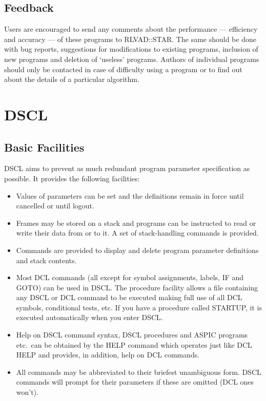 \subsection {Feedback}
Users are encouraged to send any comments about the performance --- efficiency
and accuracy --- of these programs to RLVAD::STAR.
The same should be done with bug reports, suggestions for modifications to
existing programs, inclusion of new programs and deletion of `useless' programs.
Authors of individual programs should only be contacted in case of difficulty
using a program or to find out about the details of a particular algorithm.

\section {DSCL}

\subsection {Basic Facilities}
DSCL aims to prevent as much redundant program parameter specification as
possible.
It provides the following facilities:
\begin{itemize}
\item Values of parameters can be set and the definitions remain in force
until cancelled or until logout.
\item Frames may be stored on a stack and programs can be instructed to
read or write their data from or to it.
A set of stack-handling commands is provided.
\item Commands are provided to display and delete program parameter definitions
and stack contents.
\item Most DCL commands (all except for symbol assignments, labels, IF and
GOTO) can be used in DSCL.
The procedure facility allows a file containing any DSCL or DCL command to be
executed making full use of all DCL symbols, conditional tests, etc.
If you have a procedure called STARTUP, it is executed automatically when you
enter DSCL.
\item Help on DSCL command syntax, DSCL procedures and ASPIC programs etc.\
can be obtained by the HELP command which operates just like DCL HELP and
provides, in addition, help on DCL commands.
\item All commands may be abbreviated to their briefest unambiguous form.
DSCL commands will prompt for their parameters if these are omitted (DCL ones
won't).
\end{itemize}

